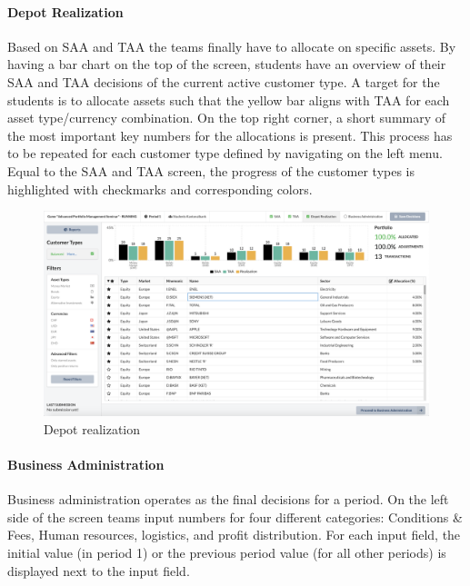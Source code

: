 \paragraph{Depot Realization}
Based on SAA and TAA the teams finally have to allocate on specific assets. By having a bar chart on the top of the screen, students have an overview of their SAA and TAA decisions of the current active customer type. A target for the students is to allocate assets such that the yellow bar aligns with TAA for each asset type/currency combination. On the top right corner, a short summary of the most important key numbers for the allocations is present.
This process has to be repeated for each customer type defined by navigating on the left menu. Equal to the SAA and TAA screen, the progress of the customer types is highlighted with checkmarks and corresponding colors.

\begin{figure}[h!]
  \centering
  \includegraphics[scale=0.2]{img/application-overview/teams/05_depot_realization.png}
  \caption{Depot realization}
\end{figure}

\paragraph{Business Administration}
Business administration operates as the final decisions for a period. On the left side of the screen teams input numbers for four different categories: Conditions \& Fees, Human resources, logistics, and profit distribution. For each input field, the initial value (in period 1) or the previous period value (for all other periods) is displayed next to the input field.\\

